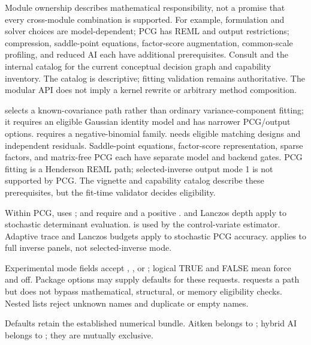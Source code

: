 \documentclass[a4paper]{book}
\begin{document}
\begin{Details}\relax
Module ownership describes mathematical responsibility, not a promise that
every cross-module combination is supported. For example, formulation and
solver choices are model-dependent; PCG has REML and output restrictions;
compression, saddle-point equations, factor-score augmentation, common-scale
profiling, and reduced AI each have additional prerequisites. Consult
 and the internal
 catalog for the current conceptual decision graph
and capability inventory. The catalog is descriptive; fitting validation
remains authoritative. The modular API does not imply a kernel rewrite or
arbitrary method composition.

 selects a known-covariance path rather than ordinary
variance-component fitting; it requires an eligible Gaussian identity model
and has narrower PCG/output options. 
requires a negative-binomial family.  needs
eligible matching designs and independent residuals. Saddle-point equations,
factor-score representation, sparse factors, and matrix-free PCG each have
separate model and backend gates. PCG fitting is a Henderson REML path;
selected-inverse output mode 1 is not supported by PCG. The vignette and
capability catalog describe these prerequisites, but the fit-time validator
decides eligibility.

Within PCG,  uses
;  and
 require  and a
positive .  and Lanczos depth
apply to stochastic determinant evaluation.  is used by the
control-variate estimator. Adaptive trace and Lanczos budgets apply to
stochastic PCG accuracy.  applies to full inverse
panels, not selected-inverse mode.

Experimental mode fields accept , , or
; logical TRUE and FALSE mean force and off. Package options
may supply defaults for these requests.  requests a path but
does not bypass mathematical, structural, or memory eligibility checks.
Nested lists reject unknown names and duplicate or empty names.

Defaults retain the established numerical bundle. Aitken belongs to
; hybrid AI belongs to
; they are mutually exclusive.


\end{Details}
\end{document}
